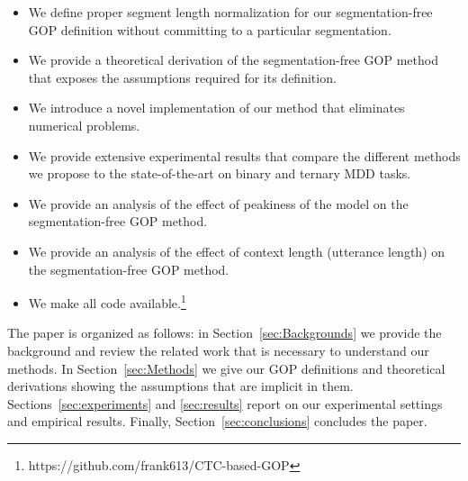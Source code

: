 \begin{itemize}
    \item We define proper segment length normalization for our segmentation-free GOP definition without committing to a particular segmentation.
    \item We provide a theoretical derivation of the segmentation-free GOP method that exposes the assumptions required for its definition.
    \item We introduce a novel implementation of our method that eliminates numerical problems.
    \item We provide extensive experimental results that compare the different methods we propose to the state-of-the-art on binary and ternary MDD tasks.
    \item We provide an analysis of the effect of peakiness of the model on the segmentation-free GOP method.
    \item We provide an analysis of the effect of context length (utterance length) on the segmentation-free GOP method.
    \item We make all code available.\footnote{https://github.com/frank613/CTC-based-GOP}
\end{itemize}

The paper is organized as follows: in Section~\ref{sec:Backgrounds} we provide the background and review the related work that is necessary to understand our methods.
In Section~\ref{sec:Methods} we give our GOP definitions and theoretical derivations showing the assumptions that are implicit in them.
Sections~\ref{sec:experiments} and \ref{sec:results} report on our experimental settings and empirical results.
Finally, Section~\ref{sec:conclusions} concludes the paper.